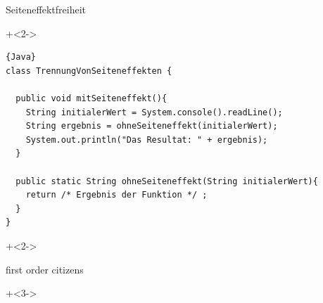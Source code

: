 \begin{frame}[fragile]{}

\begin{center}
\Large
Seiteneffektfreiheit
\end{center}

\begin{center}
\end{center}

\onslide+<2->
\begin{lstlisting}{Java}
class TrennungVonSeiteneffekten {

  public void mitSeiteneffekt(){
    String initialerWert = System.console().readLine(); 
    String ergebnis = ohneSeiteneffekt(initialerWert);
    System.out.println("Das Resultat: " + ergebnis);
  }

  public static String ohneSeiteneffekt(String initialerWert){
    return /* Ergebnis der Funktion */ ;
  }
}
\end{lstlisting}

\end{frame}

\begin{frame}[fragile]{}

\onslide+<2->
\begin{center}
\Large
{} \glqq{}first order citizens\grqq{}
\end{center}

\onslide+<3->
\begin{center}
\end{center}

\end{frame}

